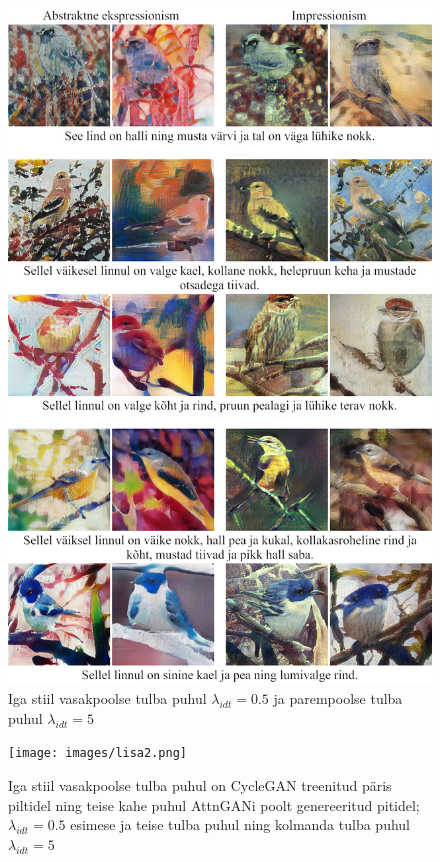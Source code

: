 \documentclass{vilgym}
\begin{document}
	\appendices
	
	\begin{figure}[H]
		\includegraphics[width=0.8\linewidth]{images/lisa1.png}
		\caption{Iga stiil vasakpoolse tulba puhul $ \lambda_{idt} = 0.5 $ ja parempoolse tulba puhul $ \lambda_{idt} = 5 $}
		\label{fig:lisa1}
	\end{figure}

	\begin{figure}[H]
		\texttt{[image: images/lisa2.png]}
		\caption{Iga stiil vasakpoolse tulba puhul on CycleGAN treenitud päris piltidel ning teise kahe puhul AttnGANi poolt genereeritud pitidel; $ \lambda_{idt} = 0.5 $ esimese ja teise tulba puhul ning kolmanda tulba puhul $ \lambda_{idt} = 5 $}
		\label{fig:lisa2}
	\end{figure}
\end{document}

